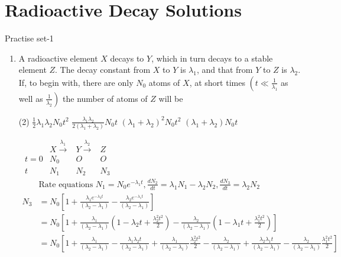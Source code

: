 \chapter{Radioactive Decay Solutions}
\begin{abox}
	Practise set-1
\end{abox}
\begin{enumerate}
	\item  A radioactive element $X$ decays to $Y$, which in turn decays to a stable element $Z$. The decay constant from $X$ to $Y$ is $\lambda_1$, and that from $Y$ to $Z$ is $\lambda_2$. If, to begin with, there are only $N_0$ atoms of $X$, at short times $\left(t \ll \frac{1}{\lambda_1}\right.$ as well as $\left.\frac{1}{\lambda_2}\right)$ the number of atoms of $Z$ will be
	{}
	\begin{tasks}(2)
		\task[\textbf{a.}]$\frac{1}{2} \lambda_1 \lambda_2 N_0 t^2$
		\task[\textbf{b.}]$\frac{\lambda_1 \lambda_2}{2\left(\lambda_1+\lambda_2\right)} N_0 t$
		\task[\textbf{c.}]$\left(\lambda_1+\lambda_2\right)^2 N_0 t^2$
		\task[\textbf{d.}]$\left(\lambda_1+\lambda_2\right) N_0 t$
	\end{tasks}
	\begin{answer}$\left. \right. $
		$\begin{array}{llll}  
		&X \stackrel{\lambda_1}{\longrightarrow}  & Y \stackrel{\lambda_2}{\longrightarrow}&Z  \\ 
		t=0 & N_0 & O & O  \\ 
		t & N_1 & N_2 & N_3\end{array}$
		\begin{align*}
		&\text{Rate equations }N_1=N_0 e^{-\lambda_1 t}, \frac{d N_2}{d t}=\lambda_1 N_1-\lambda_2 N_2, \frac{d N_3}{d t}=\lambda_2 N_2\\
		N_3&=N_0\left[1+\frac{\lambda_1 e^{-\lambda_2 t}}{\left(\lambda_2-\lambda_1\right)}-\frac{\lambda_2 e^{-\lambda_1 t}}{\left(\lambda_2-\lambda_1\right)}\right] \\
		&=N_0\left[1+\frac{\lambda_1}{\left(\lambda_2-\lambda_1\right)}\left(1-\lambda_2 t+\frac{\lambda_2^2 t^2}{2}\right)-\frac{\lambda_2}{\left(\lambda_2-\lambda_1\right)}\left(1-\lambda_1 t+\frac{\lambda_1^2 t^2}{2}\right)\right] \\
		&=N_0\left[1+\frac{\lambda_1}{\left(\lambda_2-\lambda_1\right)}-\frac{\lambda_1 \lambda_2 t}{\left(\lambda_2-\lambda_1\right)}+\frac{\lambda_1}{\left(\lambda_2-\lambda_1\right)} \frac{\lambda_2^2 t^2}{2}-\frac{\lambda_2}{\left(\lambda_2-\lambda_1\right)}+\frac{\lambda_2 \lambda_1 t}{\left(\lambda_2-\lambda_1\right)}-\frac{\lambda_2}{\left(\lambda_2-\lambda_1\right)} \frac{\lambda_1^2 t^2}{2}\right] \\

\end{align*}
\end{answer}
\end{enumerate}
